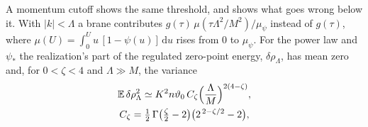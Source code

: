 \documentclass[aps,prd,10pt,twocolumn,superscriptaddress,nofootinbib,floatfix,longbibliography]{revtex4-2}
\newcommand{\bE}{\mathbb{E}}
\newcommand{\dd}{\mathrm{d}}
\begin{document}
A momentum cutoff shows the same threshold, and shows what goes wrong below it. With $|k|<\Lambda$ a brane contributes $g(\tau)\,\mu(\tau\Lambda^2/M^2)/\mu_\psi$ instead of $g(\tau)$, where $\mu(U)=\int_0^Uu\,[1-\psi(u)]\,\dd u$ rises from $0$ to $\mu_\psi$. For the power law and $\psi_*$ the realization's part of the regulated zero-point energy, $\delta\rho_\Lambda$, has mean zero and, for $0<\zeta<4$ and $\Lambda\gg M$, the variance
\begin{equation}
\label{eq:cutvar}
\begin{gathered}
\bE\,\delta\rho_\Lambda^2\simeq K^2n\vartheta_0\,C_\zeta\Bigl(\frac\Lambda M\Bigr)^{2(4-\zeta)},\\
C_\zeta=\tfrac12\,\Gamma\bigl(\tfrac\zeta2-2\bigr)\bigl(2^{\,2-\zeta/2}-2\bigr),
\end{gathered}
\end{equation}
\end{document}
